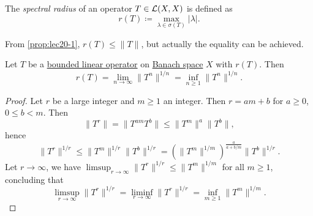 \begin{definition}\label{def:spectral-radius}
	The \emph{spectral radius} of an operator \(T\in \mathcal{\MakeUppercase{l}} (X, X)\) is defined as
	\[
		r(T) \coloneqq \max _{\lambda\in \sigma (T) }\vert \lambda \vert .
	\]
\end{definition}

From \autoref{prop:lec20-1}, \(r(T) \leq \lVert T \rVert \), but actually the equality can be achieved.

\begin{proposition}\label{prop:lec20-2}
	Let \(T\) be a \hyperref[def:bounded-linear-op]{bounded linear operator} on \hyperref[def:Banach-space]{Banach space} \(X\) with \(r(T)\). Then
	\[
		r(T) = \lim_{n \to \infty} \lVert T^n \rVert ^{1 / n} = \inf _{n\geq 1}\lVert T^n \rVert ^{1 / n}.
	\]
\end{proposition}
\begin{proof}\let\qed\relax
	Let \(r\) be a large integer and \(m\geq 1\) an integer. Then \(r = am+b\) for \(a \geq 0\), \(0 \leq b < m\). Then
	\[
		\lVert T^r \rVert
		= \lVert T^{am} T^b\rVert
		\leq \lVert T^m \rVert ^a \lVert T^b \rVert,
	\]
	hence
	\[
		\lVert T^r \rVert ^{1 / r}
		\leq \lVert T^m \rVert ^{1 / r} \lVert T^b \rVert ^{1 / r}
		= \left( \lVert T^m \rVert ^{1 / m} \right) ^{\frac{a}{a+ b / m}} \lVert T^b \rVert ^{1 / r}.
	\]
	Let \(r \to \infty \), we have \(\limsup_{r \to \infty} \lVert T^r \rVert ^{1 / r} \leq \lVert T^m \rVert ^{1 / m}\) for all \(m \geq 1\), concluding that
	\[
		\limsup_{r \to \infty} \lVert T^r \rVert ^{1 / r}
		= \liminf_{r \to \infty} \lVert T^r \rVert ^{1 / r}
		= \inf _{m\geq 1}\lVert T^m \rVert ^{1 / m}.
	\]
\end{proof}